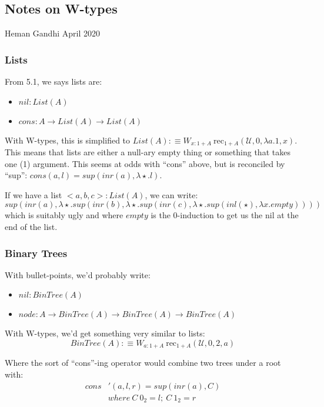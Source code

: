 \documentclass{article}
\newcommand{\U}{\mathcal{U}}
\renewcommand{\l}{\lambda}
\newcommand{\rec}{\text{rec}}
\begin{document}
\begin{center}
\subsection*{Notes on W-types}
\end{center}

Heman Gandhi
\hfill
April 2020\\

\subsubsection*{Lists}

From 5.1, we says lists are:
\begin{itemize}
\item $nil: List(A)$
\item $cons: A \to List(A) \to List(A)$
\end{itemize}

With W-types, this is simplified to $List(A) :\equiv W_{x: 1 + A}\ \rec_{1 + A}(\U, 0, \l a. 1, x)$.
This means that lists are either a null-ary empty thing or something that takes one (1)
argument. This seems at odds with ``cons'' above, but is reconciled by ``sup'':
$cons(a, l) = sup(inr(a), \l \star. l)$.

If we have a list $<a, b, c>: List(A)$, we can write:
\[
sup(inr(a), \l \star. sup(inr(b), \l \star. sup(inr(c), \l \star. sup(inl(\star), \l x. empty))))
\]
which is suitably ugly and where $empty$ is the 0-induction to get us the nil at the end of the list.

\subsubsection*{Binary Trees}

With bullet-points, we'd probably write:
\begin{itemize}
\item $nil: BinTree(A)$
\item $node: A \to BinTree(A) \to BinTree(A) \to BinTree(A)$
\end{itemize}

With W-types, we'd get something very similar to lists:
\[
BinTree(A) :\equiv W_{a: 1 + A}\ \rec_{1 + A}(\U, 0, 2, a)
\]

Where the sort of ``cons''-ing operator would combine two trees under a root with:
\begin{equation}
\begin{split}
cons&'(a, l, r) = sup(inr(a), C)\\
&where\ C\ 0_2 = l;\ C\ 1_2 = r
\end{split}
\end{equation}
\end{document}
